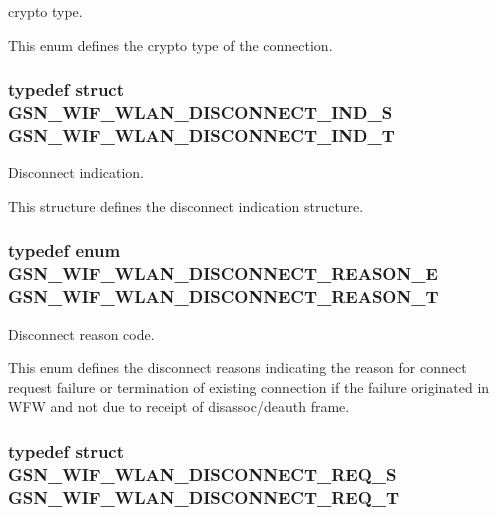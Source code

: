 crypto type. 

This enum defines the crypto type of the connection. \hypertarget{a00677_ga12e53679e526d82e7e99a05a000dbdf8}{
\subsubsection[{GSN\_\-WIF\_\-WLAN\_\-DISCONNECT\_\-IND\_\-T}]{\setlength{\rightskip}{0pt plus 5cm}typedef struct {\bf GSN\_\-WIF\_\-WLAN\_\-DISCONNECT\_\-IND\_\-S}  {\bf GSN\_\-WIF\_\-WLAN\_\-DISCONNECT\_\-IND\_\-T}}}
\label{a00677_ga12e53679e526d82e7e99a05a000dbdf8}


Disconnect indication. 

This structure defines the disconnect indication structure. \hypertarget{a00677_ga59f311fc4d769ed3a162e48be5ea59aa}{
\subsubsection[{GSN\_\-WIF\_\-WLAN\_\-DISCONNECT\_\-REASON\_\-T}]{\setlength{\rightskip}{0pt plus 5cm}typedef enum {\bf GSN\_\-WIF\_\-WLAN\_\-DISCONNECT\_\-REASON\_\-E}  {\bf GSN\_\-WIF\_\-WLAN\_\-DISCONNECT\_\-REASON\_\-T}}}
\label{a00677_ga59f311fc4d769ed3a162e48be5ea59aa}


Disconnect reason code. 

This enum defines the disconnect reasons indicating the reason for connect request failure or termination of existing connection if the failure originated in WFW and not due to receipt of disassoc/deauth frame. \hypertarget{a00677_gaf8a8c7854be001d295e7a84a9512a1d7}{
\subsubsection[{GSN\_\-WIF\_\-WLAN\_\-DISCONNECT\_\-REQ\_\-T}]{\setlength{\rightskip}{0pt plus 5cm}typedef struct {\bf GSN\_\-WIF\_\-WLAN\_\-DISCONNECT\_\-REQ\_\-S}  {\bf GSN\_\-WIF\_\-WLAN\_\-DISCONNECT\_\-REQ\_\-T}}}
\label{a00677_gaf8a8c7854be001d295e7a84a9512a1d7}


